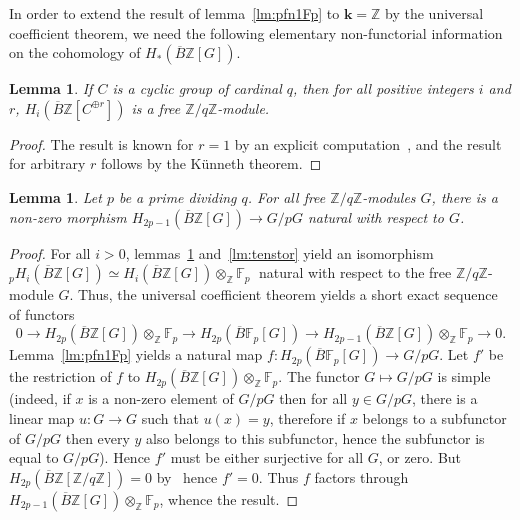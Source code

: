 \documentclass{amsart}
\newtheorem{lemma}[formula]{Lemma}
\theoremstyle{definition}
\theoremstyle{remark}
\newcommand{\Z}{\mathbb Z}
\newcommand{\F}{\mathbb F}
\def\k{\mathbf{k}}
\begin{document}
In order to extend the result of lemma~\ref{lm:pfn1Fp} to $\k=\Z$ by the universal coefficient theorem, we need the following elementary non-functorial information on the cohomology of $H_*(\overline{B}\Z[G])$.
\begin{lemma}\label{lm:descriptionHBGZ}
	If $C$ is a cyclic group of cardinal $q$, then for all positive integers $i$ and $r$, $H_i(\overline{B}\Z[C^{\oplus r}])$ is a free $\Z/q\Z$-module.
\end{lemma}
\begin{proof}
	The result is known for $r=1$ by an explicit computation~\cite[II~(3.1)]{br-94}, and the result for arbitrary $r$ follows by the K\"unneth theorem.
\end{proof}
\begin{lemma}\label{lm:pfn1Z}
	Let $p$ be a prime dividing $q$. For all free $\Z/q\Z$-modules $G$, there is a non-zero morphism $H_{2p-1}(\overline{B}\Z[G])\to G/pG$ natural with respect to $G$.
\end{lemma}
\begin{proof}
	For all $i>0$, lemmas~\ref{lm:descriptionHBGZ} and~\ref{lm:tenstor} yield an isomorphism $_p H_i(\overline{B}\Z[G])\simeq H_i(\overline{B}\Z[G])\otimes_\Z\F_p\;$ natural with respect to the free $\Z/q\Z$-module $G$.
	Thus, the universal coefficient theorem yields a short exact sequence of functors
	\[ 
		0\to 	H_{2p}(\overline{B}\Z[G])\otimes_\Z\F_p\to H_{2p}(\overline{B}\F_p[G])\to H_{2p-1}(\overline{B}\Z[G])\otimes_\Z\F_p\to0.
	\]
	Lemma~\ref{lm:pfn1Fp} yields a natural map $f\colon H_{2p}(\overline{B}\F_p[G])\to G/pG$. Let $f'$ be the restriction of $f$ to $H_{2p}(\overline{B}\Z[G])\otimes_\Z\F_p$. The functor $G\mapsto G/pG$ is simple (indeed, if $x$ is a non-zero element of $G/pG$ then for all $y\in G/pG$, there is a linear map $u\colon G\to G$ such that $u(x)=y$, therefore if $x$ belongs to a  subfunctor of $G/pG$ then every $y$ also belongs to this subfunctor, hence the subfunctor is equal to $G/pG$). Hence $f'$ must be either surjective for all $G$, or zero. But $H_{2p}(\overline{B}\Z[\Z/q\Z])=0$ by~\cite[II~(3.1)]{br-94} hence $f'=0$. Thus $f$ factors through $H_{2p-1}(\overline{B}\Z[G])\otimes_\Z\F_p$, whence the result. 
\end{proof}
\end{document}
